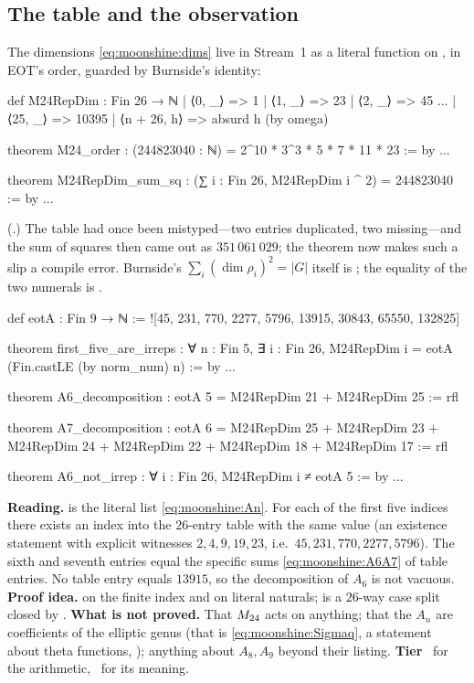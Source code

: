 \subsection{The table and the observation}

The dimensions \eqref{eq:moonshine:dims} live in Stream~1 as a literal function on
, in EOT's order, guarded by Burnside's identity:
\begin{leancode}
def M24RepDim : Fin 26 → ℕ
  | ⟨0, _⟩ => 1
  | ⟨1, _⟩ => 23
  | ⟨2, _⟩ => 45
  ...
  | ⟨25, _⟩ => 10395
  | ⟨n + 26, h⟩ => absurd h (by omega)

theorem M24_order : (244823040 : ℕ) = 2^10 * 3^3 * 5 * 7 * 11 * 23 := by ...

theorem M24RepDim_sum_sq : (∑ i : Fin 26, M24RepDim i ^ 2) = 244823040 := by ...
\end{leancode}
(.) The table had once been
mistyped---two entries duplicated, two missing---and the sum of squares then came out as
$351\,061\,029$; the theorem  now makes such a slip a compile
error. Burnside's $\sum_i(\dim\rho_i)^2=|G|$ itself is \TL; the equality of the two
numerals is \TA.

\begin{leanbox}
\begin{leancode}
def eotA : Fin 9 → ℕ := ![45, 231, 770, 2277, 5796, 13915, 30843, 65550, 132825]

theorem first_five_are_irreps :
    ∀ n : Fin 5, ∃ i : Fin 26, M24RepDim i = eotA (Fin.castLE (by norm_num) n) := by ...

theorem A6_decomposition :
    eotA 5 = M24RepDim 21 + M24RepDim 25 := rfl

theorem A7_decomposition :
    eotA 6 = M24RepDim 25 + M24RepDim 23 + M24RepDim 24 + M24RepDim 22 +
      M24RepDim 18 + M24RepDim 17 := rfl

theorem A6_not_irrep : ∀ i : Fin 26, M24RepDim i ≠ eotA 5 := by ...
\end{leancode}
\textbf{Reading.}  is the literal list \eqref{eq:moonshine:An}. For each of the
first five indices there exists an index into the $26$-entry table with the same value (an
existence statement with explicit witnesses $2,4,9,19,23$, i.e.\ $45,231,770,2277,5796$).
The sixth and seventh entries equal the specific sums \eqref{eq:moonshine:A6A7} of table
entries. No table entry equals $13915$, so the decomposition of $A_6$ is not vacuous.
\textbf{Proof idea.}  on the finite index and  on literal
naturals;  is a $26$-way case split closed by .
\textbf{What is not proved.} That $M_{24}$ acts on anything; that the $A_n$ are coefficients
of the elliptic genus (that is \eqref{eq:moonshine:Sigmaq}, a statement about theta
functions, \TL); anything about $A_8,A_9$ beyond their listing. \textbf{Tier} \TA\ for the
arithmetic, \TL\ for its meaning.
\end{leanbox}


